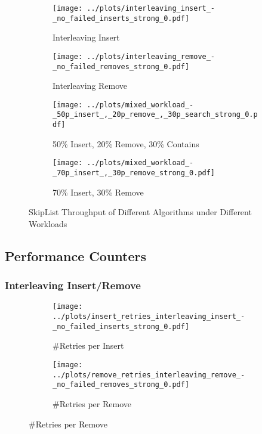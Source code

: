 \begin{figure}[H]
    \centering
    
    \begin{subfigure}[b]{0.49\textwidth}
        \texttt{[image: ../plots/interleaving\_insert\_-\_no\_failed\_inserts\_strong\_0.pdf]}
        \caption{Interleaving Insert}
    \end{subfigure}
    \begin{subfigure}[b]{0.49\textwidth}
        \texttt{[image: ../plots/interleaving\_remove\_-\_no\_failed\_removes\_strong\_0.pdf]}
        \caption{Interleaving Remove}
    \end{subfigure}
    
    \begin{subfigure}[b]{0.49\textwidth}
        \texttt{[image: ../plots/mixed\_workload\_-\_50p\_insert\_,\_20p\_remove\_,\_30p\_search\_strong\_0.pdf]}
        \caption{50\% Insert, 20\% Remove, 30\% Contains}
    \end{subfigure}
    \begin{subfigure}[b]{0.49\textwidth}
        \texttt{[image: ../plots/mixed\_workload\_-\_70p\_insert\_,\_30p\_remove\_strong\_0.pdf]}
        \caption{70\% Insert, 30\% Remove}
    \end{subfigure}
    
    \caption{SkipList Throughput of Different Algorithms under Different Workloads}
\end{figure}


\subsection{Performance Counters}\label{sec:perf_counter}

\subsubsection*{Interleaving Insert/Remove}

\begin{figure}[H]
    \centering
    
    \begin{subfigure}[b]{0.49\textwidth}
        \texttt{[image: ../plots/insert\_retries\_interleaving\_insert\_-\_no\_failed\_inserts\_strong\_0.pdf]}
        \caption{\#Retries per Insert}
        \label{fig:insert_retries_interleaving_insert_}
    \end{subfigure}
    \begin{subfigure}[b]{0.49\textwidth}
        \texttt{[image: ../plots/remove\_retries\_interleaving\_remove\_-\_no\_failed\_removes\_strong\_0.pdf]}
        \caption{\#Retries per Remove}
        \label{fig:remove_retries_interleaving_remove_}
    \end{subfigure}
\end{figure} 


